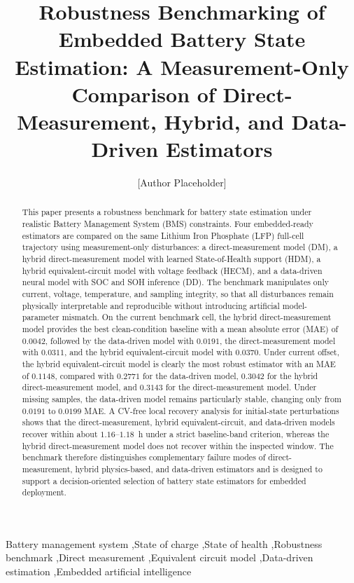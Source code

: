 \documentclass[review]{elsarticle}
\date{}
\begin{document}
\linenumbers
\begin{frontmatter}
\title{Robustness Benchmarking of Embedded Battery State Estimation: A Measurement-Only Comparison of Direct-Measurement, Hybrid, and Data-Driven Estimators}
\author[1]{[Author Placeholder]}
\begin{abstract}
This paper presents a robustness benchmark for battery state estimation under realistic Battery Management System (BMS) constraints. Four embedded-ready estimators are compared on the same Lithium Iron Phosphate (LFP) full-cell trajectory using measurement-only disturbances: a direct-measurement model (DM), a hybrid direct-measurement model with learned State-of-Health support (HDM), a hybrid equivalent-circuit model with voltage feedback (HECM), and a data-driven neural model with SOC and SOH inference (DD). The benchmark manipulates only current, voltage, temperature, and sampling integrity, so that all disturbances remain physically interpretable and reproducible without introducing artificial model-parameter mismatch. On the current benchmark cell, the hybrid direct-measurement model provides the best clean-condition baseline with a mean absolute error (MAE) of $0.0042$, followed by the data-driven model with $0.0191$, the direct-measurement model with $0.0311$, and the hybrid equivalent-circuit model with $0.0370$. Under current offset, the hybrid equivalent-circuit model is clearly the most robust estimator with an MAE of $0.1148$, compared with $0.2771$ for the data-driven model, $0.3042$ for the hybrid direct-measurement model, and $0.3143$ for the direct-measurement model. Under missing samples, the data-driven model remains particularly stable, changing only from $0.0191$ to $0.0199$ MAE. A CV-free local recovery analysis for initial-state perturbations shows that the direct-measurement, hybrid equivalent-circuit, and data-driven models recover within about $1.16$--$1.18$~h under a strict baseline-band criterion, whereas the hybrid direct-measurement model does not recover within the inspected window. The benchmark therefore distinguishes complementary failure modes of direct-measurement, hybrid physics-based, and data-driven estimators and is designed to support a decision-oriented selection of battery state estimators for embedded deployment.
\end{abstract}
\begin{keyword}
Battery management system \sep State of charge \sep State of health \sep Robustness benchmark \sep Direct measurement \sep Equivalent circuit model \sep Data-driven estimation \sep Embedded artificial intelligence
\end{keyword}
\end{frontmatter}
\end{document}

